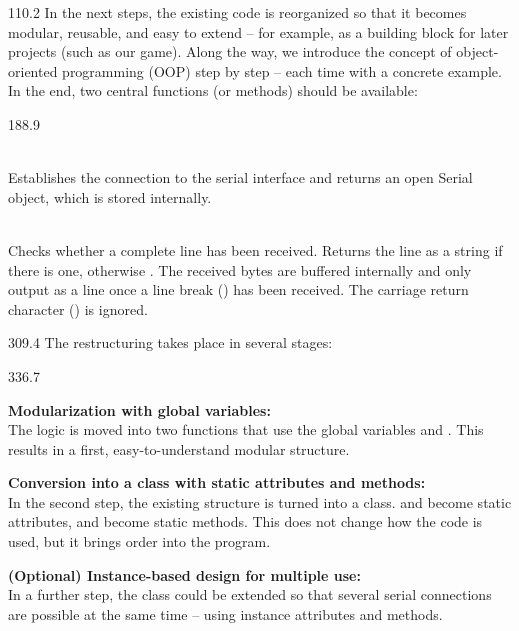 \documentclass{aslab}
\begin{document}
\begin{region}[pitch=13.17]{110.2}
In the next steps, the existing code is reorganized so that it becomes
modular, reusable, and easy to extend -- for example, as a building block
for later projects (such as our game). Along the way, we introduce the
concept of object-oriented programming (OOP) step by step -- each time with a
concrete example.\\
In the end, two central functions (or methods) should be available:
\end{region}

\begin{region}[pitch=13.44]{188.9}
\begin{dashlist}
\item {}\\
  Establishes the connection to the serial interface and returns an open
  Serial object, which is stored internally.
\item {}\\
  Checks whether a complete line has been received. Returns the line as a
  string if there is one, otherwise . The received bytes are
  buffered internally and only output as a line once a line break
  (\code{\n}) has been received. The carriage return character (\code{\r})
  is ignored.
\end{dashlist}
\end{region}

\begin{region}{309.4}
The restructuring takes place in several stages:
\end{region}

\begin{region}[pitch=13.55]{336.7}
\begin{ptasks}
\item \textbf{Modularization with global variables:}\\
  The logic is moved into two functions that use the global variables
   and . This results in a first, easy-to-understand
  modular structure.
\item \textbf{Conversion into a class with static attributes and methods:}\\
  In the second step, the existing structure is turned into a class.
   and  become static attributes,  and
   become static methods. This does not change how the code
  is used, but it brings order into the program.
\item \textbf{(Optional) Instance-based design for multiple use:}\\
  In a further step, the class could be extended so that several serial
  connections are possible at the same time -- using instance attributes
  and methods.
\end{ptasks}
\end{region}
\end{document}
